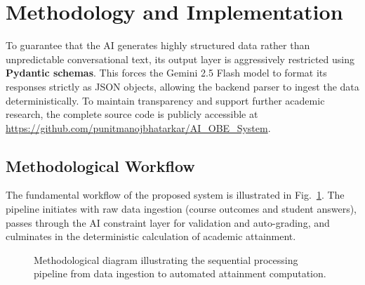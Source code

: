 \documentclass[conference]{IEEEtran}
\begin{document}
\section{Methodology and Implementation}

To guarantee that the AI generates highly structured data rather than unpredictable conversational text, its output layer is aggressively restricted using \textbf{Pydantic schemas}. This forces the Gemini 2.5 Flash model to format its responses strictly as JSON objects, allowing the backend parser to ingest the data deterministically. To maintain transparency and support further academic research, the complete source code is publicly accessible at \url{https://github.com/punitmanojbhatarkar/AI_OBE_System}.

\subsection{Methodological Workflow}

The fundamental workflow of the proposed system is illustrated in Fig.~\ref{fig:methodology}. The pipeline initiates with raw data ingestion (course outcomes and student answers), passes through the AI constraint layer for validation and auto-grading, and culminates in the deterministic calculation of academic attainment.

\begin{figure}[htbp]
\centering
{}
\caption{Methodological diagram illustrating the sequential processing pipeline from data ingestion to automated attainment computation.}
\label{fig:methodology}
\end{figure}
\end{document}
